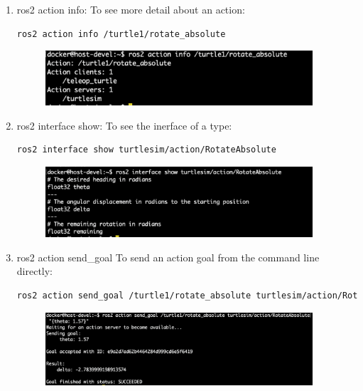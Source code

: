 \documentclass[12pt, a4paper]{article}
\begin{document}
\begin{enumerate}
\item ros2 action info:
To see more detail about an action:
\begin{lstlisting}[language=bash]
ros2 action info /turtle1/rotate_absolute
\end{lstlisting}
\begin{figure}[h]
	\setlength{\leftskip}{2.4em}
	\includegraphics[width=0.94\textwidth]{p1.7-4}
\end{figure}

\item ros2 interface show:
To see the inerface of a type:
\begin{lstlisting}[language=bash]
ros2 interface show turtlesim/action/RotateAbsolute
\end{lstlisting}
\begin{figure}[h]
	\setlength{\leftskip}{2.4em}
	\includegraphics[width=0.94\textwidth]{p1.7-5}
\end{figure}

\item ros2 action send\_goal
To send an action goal from the command line directly:
\begin{lstlisting}[language=bash]
ros2 action send_goal /turtle1/rotate_absolute turtlesim/action/RotateAbsolute "{theta: 1.57}"
\end{lstlisting}
\begin{figure}[h]
	\setlength{\leftskip}{2.4em}
	\includegraphics[width=0.94\textwidth]{p1.7-6}
\end{figure}


\end{enumerate}
\end{document}
